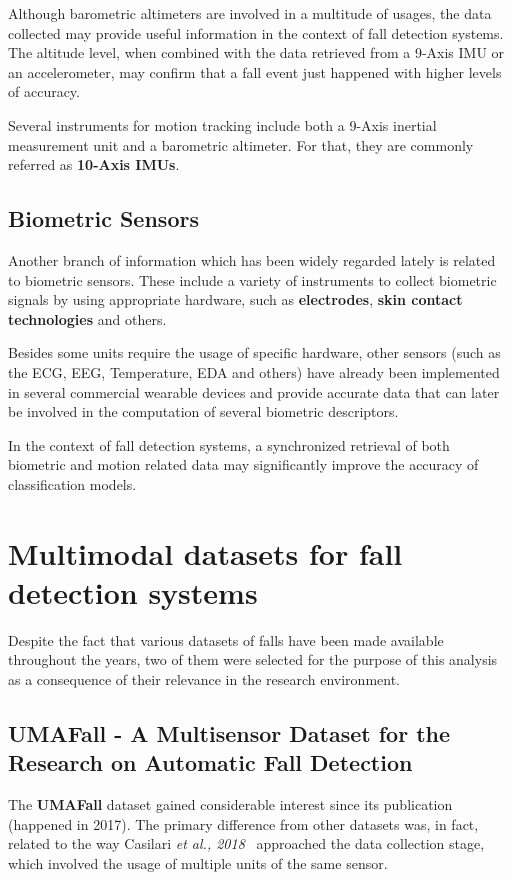 Although barometric altimeters are involved in a multitude of usages, the data collected may provide useful information in the context of fall detection systems. The altitude level, when combined with the data retrieved from a 9-Axis IMU or an accelerometer, may confirm that a fall event just happened with higher levels of accuracy.

Several instruments for motion tracking include both a 9-Axis inertial measurement unit and a barometric altimeter. For that, they are commonly referred as \textbf{10-Axis IMUs}.

\subsection{Biometric Sensors}\label{subsec:biometric-sensors}

Another branch of information which has been widely regarded lately is related to biometric sensors. These include a variety of instruments to collect biometric signals by using appropriate hardware, such as \textbf{electrodes}, \textbf{skin contact technologies} and others.

Besides some units require the usage of specific hardware, other sensors (such as the ECG, EEG, Temperature, EDA and others) have already been implemented in several commercial wearable devices and provide accurate data that can later be involved in the computation of several biometric descriptors. 

In the context of fall detection systems, a synchronized retrieval of both biometric and motion related data may significantly improve the accuracy of classification models.

\section{Multimodal datasets for fall detection systems}\label{sec:datasets}

Despite the fact that various datasets of falls have been made available throughout the years, two of them were selected for the purpose of this analysis as a consequence of their relevance in the research environment.

\subsection{UMAFall - A Multisensor Dataset for the Research on Automatic Fall Detection}\label{subsec:umafall}

The \textbf{UMAFall} dataset gained considerable interest since its publication (happened in 2017). The primary difference from other datasets was, in fact, related to the way Casilari \textit{et al., 2018}~\cite{umafall} approached the data collection stage, which involved the usage of multiple units of the same sensor. 


